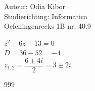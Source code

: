 \documentclass[a4paper]{article}
\begin{document}
  
\noindent \large Auteur: Odia Kibor \\
\noindent \large Studierichting: Informatica\\
\noindent \large Oefeningenreeks 1B nr. 40.9 \\

\medskip

\normalsize

$z^2 - 6z + 13 = 0$\\

$D = 36 - 52 = -4$\\

$z_{1,2} = \dfrac{6\pm4i}{2} = 3\pm 2i$\\


\begin{thebibliography}{999}
\end{thebibliography}
\end{document}
